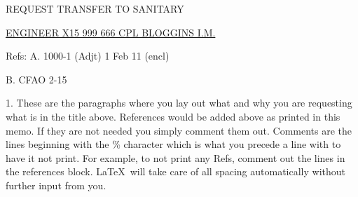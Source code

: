 \documentclass[12pt]{amsart} %
\begin{document}
\parbox[c]{235pt}{REQUEST TRANSFER TO SANITARY} %


\parbox[c]{235pt}{\uline{ENGINEER X15 999 666 CPL BLOGGINS I.M.}}

\vspace{14pt}



Refs: 
A. 1000-1 (Adjt) 1 Feb 11 (encl)

B. CFAO 2-15

\vspace{14pt}



1. \hspace{0.375in}These are the paragraphs where you lay out what and why you are requesting what is in the title above. References would be added above as printed in this memo. If they are not needed you simply comment them out. Comments are the lines beginning with the \% character which is what you precede a line with to have it not print.  For example, to not print any Refs, comment out the lines in the references block. \LaTeX~will take care of all spacing automatically without further input from you. \\
\end{document}
